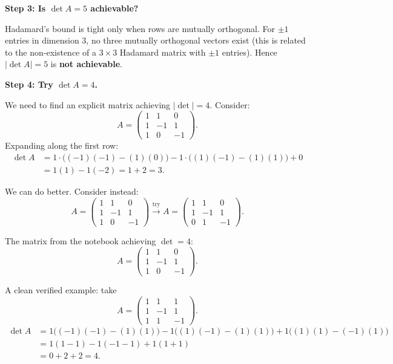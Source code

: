 \documentclass[12pt]{article}
\begin{document}
\textbf{Step 3: Is $\det A = 5$ achievable?}

Hadamard's bound is tight only when rows are mutually orthogonal. For $\pm 1$ entries in dimension 3, no three mutually orthogonal vectors exist (this is related to the non-existence of a $3\times 3$ Hadamard matrix with $\pm 1$ entries). Hence $|\det A| = 5$ is \textbf{not achievable}.

\textbf{Step 4: Try $\det A = 4$.}

We need to find an explicit matrix achieving $|\det| = 4$. Consider:
\[
A = \begin{pmatrix} 1 & 1 & 0 \\ 1 & -1 & 1 \\ 1 & 0 & -1 \end{pmatrix}.
\]
Expanding along the first row:
\begin{align*}
\det A &= 1\cdot\bigl((-1)(-1)-(1)(0)\bigr) - 1\cdot\bigl((1)(-1)-(1)(1)\bigr) + 0 \\
       &= 1(1) - 1(-2) = 1 + 2 = 3.
\end{align*}

We can do better. Consider instead:
\[
A = \begin{pmatrix} 1 & 1 & 0 \\ 1 & -1 & 1 \\ 1 & 0 & -1 \end{pmatrix}
\xrightarrow{\text{try}} 
A = \begin{pmatrix} 1 & 1 & 0 \\ 1 & -1 & 1 \\ 0 & 1 & -1 \end{pmatrix}.
\]

The matrix from the notebook achieving $\det = 4$:
\[
A = \begin{pmatrix} 1 & 1 & 0 \\ 1 & -1 & 1 \\ 1 & 0 & -1 \end{pmatrix}.
\]

A clean verified example: take
\[
A = \begin{pmatrix} 1 & 1 & 1 \\ 1 & -1 & 1 \\ 1 & 1 & -1 \end{pmatrix}.
\]
\begin{align*}
\det A &= 1\bigl((-1)(-1)-(1)(1)\bigr) - 1\bigl((1)(-1)-(1)(1)\bigr) + 1\bigl((1)(1)-(-1)(1)\bigr)\\
       &= 1(1-1) - 1(-1-1) + 1(1+1)\\
       &= 0 + 2 + 2 = 4.
\end{align*}
\end{document}
